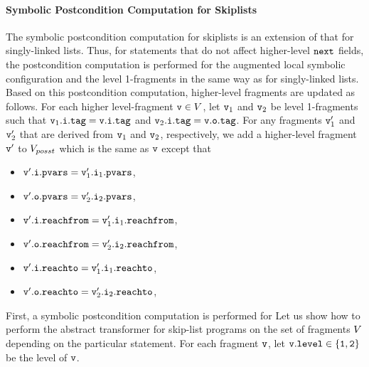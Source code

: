  \paragraph{Symbolic Postcondition Computation for Skiplists}
 The symbolic postcondition computation for skiplists is an extension of that
 for singly-linked lists. Thus, for statements that
do not affect higher-level $\tt next$ fields,
   the postcondition computation is performed for the augmented local
   symbolic configuration and the level 1-fragments in the same way as
   for singly-linked lists.
   Based on this postcondition computation, higher-level fragments are
   updated as follows.
     For each higher level-fragment $\mathtt{v} \in V$, let
     $\mathtt{v}_1$ and $\mathtt{v}_2$ be level 1-fragments such that
     $\mathtt{v}_1.\mathtt{i}.\mathtt{tag} = \mathtt{v}.\mathtt{i}.\mathtt{tag}$ and
     $\mathtt{v}_2.\mathtt{i}.\mathtt{tag} = \mathtt{v}.\mathtt{o}.\mathtt{tag}$.
     For any fragments $\mathtt{v}_1'$ and $\mathtt{v}_2'$ that are derived from
     $\mathtt{v}_1$ and $\mathtt{v}_2$, respectively, we add a higher-level
     fragment $\mathtt{v}'$ to $V_{posst}$
     which is the same as $\mathtt{v}$ except that 
\begin{itemize}
\item $\mathtt{v}'.\mathtt{i}.\mathtt{pvars} = \mathtt{v}_1'.\mathtt{i}_1.\mathtt{pvars}$,
\item $\mathtt{v}'.\mathtt{o}.\mathtt{pvars} = \mathtt{v}_2'.\mathtt{i}_2.\mathtt{pvars}$,
\item $\mathtt{v}'.\mathtt{i}.\mathtt{reachfrom} = \mathtt{v}_1'.\mathtt{i}_1.\mathtt{reachfrom}$,
\item $\mathtt{v}'.\mathtt{o}.\mathtt{reachfrom} = \mathtt{v}_2'.\mathtt{i}_2.\mathtt{reachfrom}$,
\item $\mathtt{v}'.\mathtt{i}.\mathtt{reachto} = \mathtt{v}_1'.\mathtt{i}_1.\mathtt{reachto}$,
\item $\mathtt{v}'.\mathtt{o}.\mathtt{reachto} =  \mathtt{v}_2'.\mathtt{i}_2.\mathtt{reachto}$,
\end{itemize}


 First, a symbolic postcondition computation is performed for 
Let us show how to perform the abstract transformer for skip-list programs on the set of fragments $V$ depending on the particular statement.
For each fragment $\tt v$, let $\tt v.level \in \{1,2\}$ be the level of $\tt v$.

